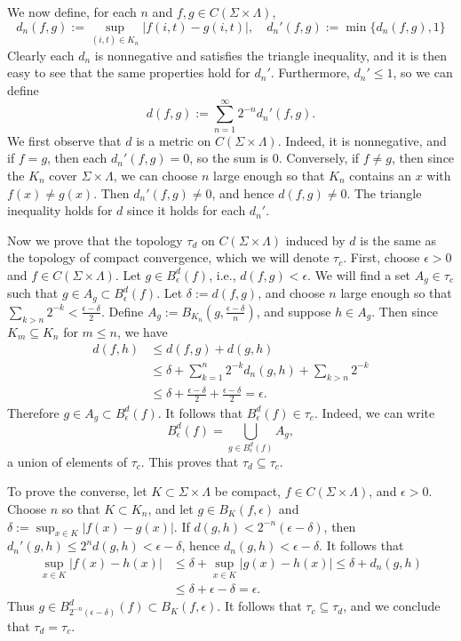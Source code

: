 \documentclass[12pt]{article}
\begin{document}
		We now define, for each $n$ and $f,g\in C(\Sigma\times\Lambda)$,
		\[
		d_n(f,g) := \sup_{(i,t)\in K_n} |f(i,t)-g(i,t)|,\quad d_n'(f,g) := \min\{d_n(f,g), 1\} 
		\]
		Clearly each $d_n$ is nonnegative and satisfies the triangle inequality, and it is then easy to see that the same properties hold for $d_n'$. Furthermore, $d_n'\leq 1$, so we can define
		\[
		d(f,g) := \sum_{n=1}^\infty 2^{-n} d_n'(f,g).
		\]
		We first observe that $d$ is a metric on $C(\Sigma\times\Lambda)$. Indeed, it is nonnegative, and if $f=g$, then each $d_n'(f,g)=0$, so the sum is 0. Conversely, if $f\neq g$, then since the $K_n$ cover $\Sigma\times\Lambda$, we can choose $n$ large enough so that $K_n$ contains an $x$ with $f(x)\neq g(x)$. Then $d_n'(f,g)\neq 0$, and hence $d(f,g)\neq 0$. The triangle inequality holds for $d$ since it holds for each $d_n'$.
		
		Now we prove that the topology $\tau_d$ on $C(\Sigma\times\Lambda)$ induced by $d$ is the same as the topology of compact convergence, which we will denote $\tau_c$. First, choose $\epsilon>0$ and $f\in C(\Sigma\times\Lambda)$. Let $g\in B^d_\epsilon(f)$, i.e., $d(f,g)<\epsilon$. We will find a set $A_g\in\tau_c$ such that $g\in A_g\subset B^d_\epsilon(f)$. Let $\delta := d(f,g)$, and choose $n$ large enough so that $\sum_{k>n} 2^{-k} < \frac{\epsilon-\delta}{2}$. Define $A_g := B_{K_n}(g,\frac{\epsilon-\delta}{n})$, and suppose $h\in A_g$. Then since $K_m\subseteq K_n$ for $m\leq n$, we have
		\begin{align*}
		d(f,h) &\leq d(f,g) + d(g,h)\\
		&\leq \delta + \sum_{k=1}^n 2^{-k}d_n(g,h) + \sum_{k>n} 2^{-k}\\
		&\leq \delta + \frac{\epsilon-\delta}{2} + \frac{\epsilon-\delta}{2} = \epsilon.
		\end{align*}
		Therefore $g\in A_g\subset B^d_\epsilon(f)$. It follows that $B^d_\epsilon(f)\in \tau_c$. Indeed, we can write
		\[
		B^d_\epsilon(f) = \bigcup_{g\in B^d_\epsilon(f)} A_g,
		\]
		a union of elements of $\tau_c$. This proves that $\tau_d\subseteq\tau_c$.
		
		To prove the converse, let $K\subset\Sigma\times\Lambda$ be compact, $f\in C(\Sigma\times\Lambda)$, and $\epsilon>0$. Choose $n$ so that $K\subset K_n$, and let $g\in B_K(f,\epsilon)$ and $\delta:= \sup_{x\in K} |f(x)-g(x)|$. If $d(g,h) < 2^{-n}(\epsilon-\delta)$, then $d_n'(g,h) \leq 2^n d(g,h) < \epsilon-\delta$, hence $d_n(g,h) < \epsilon-\delta$. It follows that
		\begin{align*}
		\sup_{x\in K} |f(x)-h(x)| &\leq \delta + \sup_{x\in K} |g(x)-h(x)| \leq \delta + d_n(g,h)\\
		&\leq \delta + \epsilon-\delta = \epsilon.
		\end{align*}
		Thus $g\in B^d_{2^{-n}(\epsilon-\delta)}(f) \subset B_K(f,\epsilon)$. It follows that $\tau_c\subseteq \tau_d$, and we conclude that $\tau_d = \tau_c$.
		
\end{document}
